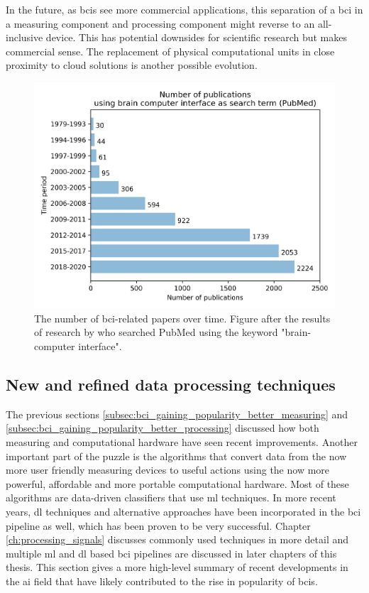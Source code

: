 In the future, as \glspl{bci} see more commercial applications, this separation of a \gls{bci} in a measuring component and processing component might reverse to an all-inclusive device.
This has potential downsides for scientific research but makes commercial sense.
The replacement of physical computational units in close proximity to cloud solutions is another possible evolution.

\begin{figure}[ht]
    \centering
    \includegraphics[width=0.8\linewidth]{../images/introduction/papers_on_bci.pdf}
    \captionsetup{width=0.7\linewidth}
    \captionsetup{justification=centering}
    \caption{The number of \gls{bci}-related papers over time. Figure after the results of research by \citet{bci_progress_overview} who searched PubMed using the keyword "brain-computer interface".}
    \label{fig:bci_publications}
\end{figure}



\subsection{New and refined data processing techniques}
\label{subsec:bci_gaining_popularity_improved_data_processing}


The previous sections \ref{subsec:bci_gaining_popularity_better_measuring} and \ref{subsec:bci_gaining_popularity_better_processing} discussed how both measuring and computational hardware have seen recent improvements.
Another important part of the puzzle is the algorithms that convert data from the now more user friendly measuring devices to useful actions using the now more powerful, affordable and more portable computational hardware.
Most of these algorithms are data-driven classifiers that use \gls{ml} techniques.
In more recent years, \gls{dl} techniques and alternative approaches have been incorporated in the \gls{bci} pipeline as well, which has been proven to be very successful. 
Chapter \ref{ch:processing_signals} discusses commonly used techniques in more detail and multiple \gls{ml} and \gls{dl} based \gls{bci} pipelines are discussed in later chapters of this thesis.
This section gives a more high-level summary of recent developments in the \gls{ai} field that have likely contributed to the rise in popularity of \glspl{bci}.

